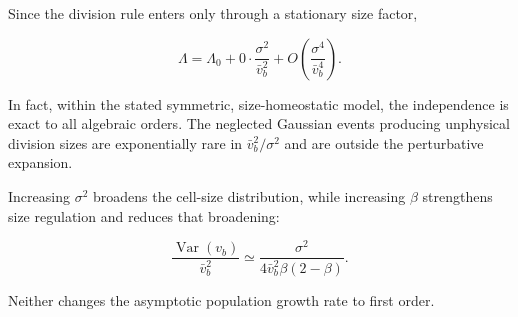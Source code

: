 Since the division rule enters only through a stationary size factor,

\[
\Lambda = \Lambda_0 + 0\cdot\frac{\sigma^2}{\bar v_b^2} + O\!\left(\frac{\sigma^4}{\bar v_b^4}\right).
\]

In fact, within the stated symmetric, size-homeostatic model, the independence is exact to all algebraic orders. The neglected Gaussian events producing unphysical division sizes are exponentially rare in $\bar v_b^2/\sigma^2$ and are outside the perturbative expansion.

Increasing $\sigma^2$ broadens the cell-size distribution, while increasing $\beta$ strengthens size regulation and reduces that broadening:

\[
\frac{\operatorname{Var}(v_b)}{\bar v_b^2} \simeq \frac{\sigma^2} {4\bar v_b^2\beta(2-\beta)}.
\]

Neither changes the asymptotic population growth rate to first order.
